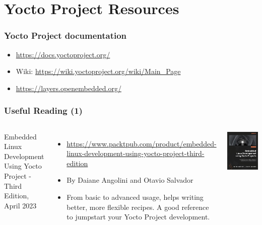 \section{Yocto Project Resources}

\begin{frame}
  \frametitle{Yocto Project documentation}
  \begin{itemize}
  \item \url{https://docs.yoctoproject.org/}
  \item Wiki: \url{https://wiki.yoctoproject.org/wiki/Main_Page}
  \item \url{https://layers.openembedded.org/}
  \end{itemize}
\end{frame}

\begin{frame}
  \frametitle{Useful Reading (1)}
  \begin{columns}
    Embedded Linux Development Using Yocto Project - Third Edition, April 2023
    \begin{itemize}
    \item \url{https://www.packtpub.com/product/embedded-linux-development-using-yocto-project-third-edition}
    \item By Daiane Angolini and Otavio Salvador
    \item From basic to advanced usage, helps writing better, more
      flexible recipes. A good reference to jumpstart your Yocto
      Project development.
    \end{itemize}
    \includegraphics[width=\textwidth]{slides/yocto-resources/ELDYP.jpg}
  \end{columns}
\end{frame}

